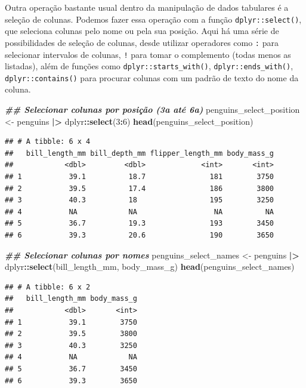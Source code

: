 \documentclass[
]{article}
\newenvironment{Shaded}{\begin{snugshade}}{\end{snugshade}}
\newcommand{\DecValTok}[1]{\textcolor[rgb]{0.00,0.00,0.81}{#1}}
\newcommand{\DocumentationTok}[1]{\textcolor[rgb]{0.56,0.35,0.01}{\textbf{\textit{#1}}}}
\newcommand{\FunctionTok}[1]{\textcolor[rgb]{0.13,0.29,0.53}{\textbf{#1}}}
\newcommand{\NormalTok}[1]{#1}
\newcommand{\OtherTok}[1]{\textcolor[rgb]{0.56,0.35,0.01}{#1}}
\newcommand{\SpecialCharTok}[1]{\textcolor[rgb]{0.81,0.36,0.00}{\textbf{#1}}}
\begin{document}
Outra operação bastante usual dentro da manipulação de dados tabulares é a seleção de colunas. Podemos fazer essa operação com a função \texttt{dplyr::select()}, que seleciona colunas pelo nome ou pela sua posição. Aqui há uma série de possibilidades de seleção de colunas, desde utilizar operadores como \texttt{:} para selecionar intervalos de colunas, \texttt{!} para tomar o complemento (todas menos as listadas), além de funções como \texttt{dplyr::starts\_with()}, \texttt{dplyr::ends\_with()}, \texttt{dplyr::contains()} para procurar colunas com um padrão de texto do nome da coluna.

\begin{Shaded}
\begin{Highlighting}[]
\DocumentationTok{\#\# Selecionar colunas por posição (3a até 6a)}
\NormalTok{penguins\_select\_position }\OtherTok{\textless{}{-}}\NormalTok{ penguins }\SpecialCharTok{|\textgreater{}} 
\NormalTok{    dplyr}\SpecialCharTok{::}\FunctionTok{select}\NormalTok{(}\DecValTok{3}\SpecialCharTok{:}\DecValTok{6}\NormalTok{)}
\FunctionTok{head}\NormalTok{(penguins\_select\_position)}
\end{Highlighting}
\end{Shaded}

\begin{verbatim}
## # A tibble: 6 x 4
##   bill_length_mm bill_depth_mm flipper_length_mm body_mass_g
##            <dbl>         <dbl>             <int>       <int>
## 1           39.1          18.7               181        3750
## 2           39.5          17.4               186        3800
## 3           40.3          18                 195        3250
## 4           NA            NA                  NA          NA
## 5           36.7          19.3               193        3450
## 6           39.3          20.6               190        3650
\end{verbatim}

\begin{Shaded}
\begin{Highlighting}[]
\DocumentationTok{\#\# Selecionar colunas por nomes}
\NormalTok{penguins\_select\_names }\OtherTok{\textless{}{-}}\NormalTok{ penguins }\SpecialCharTok{|\textgreater{}} 
\NormalTok{    dplyr}\SpecialCharTok{::}\FunctionTok{select}\NormalTok{(bill\_length\_mm, body\_mass\_g)}
\FunctionTok{head}\NormalTok{(penguins\_select\_names)}
\end{Highlighting}
\end{Shaded}

\begin{verbatim}
## # A tibble: 6 x 2
##   bill_length_mm body_mass_g
##            <dbl>       <int>
## 1           39.1        3750
## 2           39.5        3800
## 3           40.3        3250
## 4           NA            NA
## 5           36.7        3450
## 6           39.3        3650
\end{verbatim}
\end{document}
